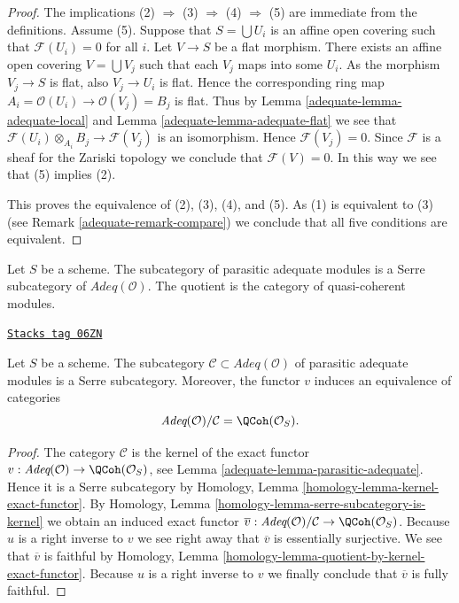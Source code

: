 \begin{proof}

The implications (2) $\Rightarrow$ (3) $\Rightarrow$ (4) $\Rightarrow$ (5)
are immediate from the definitions. Assume (5). Suppose that
$S = \bigcup U_i$ is an affine open covering such that $\mathcal{F}(U_i) = 0$
for all $i$. Let $V \to S$ be a flat morphism. There exists an affine
open covering $V = \bigcup V_j$ such that each $V_j$ maps into some
$U_i$. As the morphism $V_j \to S$ is flat, also $V_j \to U_i$ is flat.
Hence the corresponding ring map
$A_i = \mathcal{O}(U_i) \to \mathcal{O}(V_j) = B_j$ is flat. Thus by
Lemma \ref{adequate-lemma-adequate-local}
and
Lemma \ref{adequate-lemma-adequate-flat}
we see that $\mathcal{F}(U_i) \otimes_{A_i} B_j \to \mathcal{F}(V_j)$
is an isomorphism. Hence $\mathcal{F}(V_j) = 0$. Since $\mathcal{F}$ is
a sheaf for the Zariski topology we conclude that $\mathcal{F}(V) = 0$.
In this way we see that (5) implies (2).

\medskip\noindent
This proves the equivalence of (2), (3), (4), and (5).
As (1) is equivalent to (3) (see
Remark \ref{adequate-remark-compare})
we conclude that all five conditions are equivalent.
\end{proof}

Let $S$ be a scheme.
The subcategory of parasitic adequate modules is a Serre subcategory of
$\textit{Adeq}(\mathcal{O})$. The quotient is the category of
quasi-coherent modules.

\begin{lemma}
\label{adequate-lemma-adequate-by-parasitic}
\href{https://stacks.math.columbia.edu/tag/06ZN}{\texttt{Stacks tag 06ZN}}

Let $S$ be a scheme. The subcategory
$\mathcal{C} \subset \textit{Adeq}(\mathcal{O})$ of parasitic adequate
modules is a Serre subcategory. Moreover, the functor $v$ induces
an equivalence of categories
$$
\textit{Adeq}(\mathcal{O}) / \mathcal{C} = \QCoh(\mathcal{O}_S).
$$
\end{lemma}

\begin{proof}

The category $\mathcal{C}$ is the kernel of the exact functor
$v : \textit{Adeq}(\mathcal{O}) \to \QCoh(\mathcal{O}_S)$, see
Lemma \ref{adequate-lemma-parasitic-adequate}.
Hence it is a Serre subcategory by
Homology, Lemma \ref{homology-lemma-kernel-exact-functor}.
By
Homology, Lemma \ref{homology-lemma-serre-subcategory-is-kernel}
we obtain an induced exact functor
$\overline{v} :
\textit{Adeq}(\mathcal{O}) / \mathcal{C}
\to
\QCoh(\mathcal{O}_S)$.
Because $u$ is a right inverse to $v$ we see right away that
$\overline{v}$ is essentially surjective.
We see that $\overline{v}$ is faithful by
Homology, Lemma \ref{homology-lemma-quotient-by-kernel-exact-functor}.
Because $u$ is a right inverse to $v$ we finally conclude that
$\overline{v}$ is fully faithful.
\end{proof}

